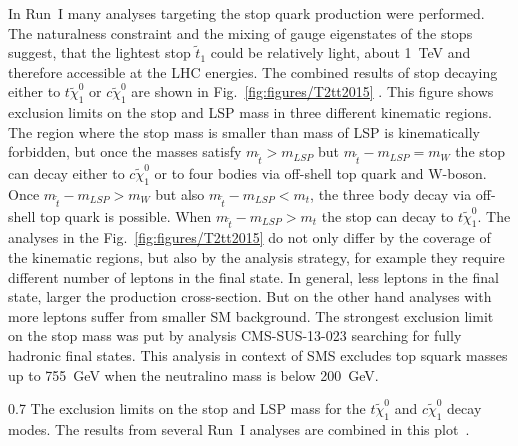 In Run~I many analyses targeting the stop quark production were performed. The naturalness constraint and the mixing of gauge eigenstates of the stops suggest, that the lightest stop $\tilde{t}_{1}$ could be relatively light, about 1~TeV and therefore accessible at the LHC energies. The combined results of stop decaying either to $t \tilde{\chi}_{1}^0$ or $c \tilde{\chi}_{1}^0$ are shown in Fig.~\ref{fig:figures/T2tt2015} . This figure shows exclusion limits on the stop and LSP mass in three different kinematic regions. The region where the stop mass is smaller than mass of LSP is kinematically forbidden, but once the masses satisfy $m_{\tilde{t}} > m_{LSP}$ but $m_{\tilde{t}} - m_{LSP} = m_{W}$ the stop can decay either to $c \tilde{\chi}_{1}^0$ or to four bodies via off-shell top quark and W-boson. Once  $m_{\tilde{t}} - m_{LSP} > m_{W}$ but also  $m_{\tilde{t}} - m_{LSP} < m_{t}$, the three body decay via off-shell top quark is possible. When  $m_{\tilde{t}} - m_{LSP} > m_{t}$  the stop can decay to $t \tilde{\chi}_{1}^0$. The analyses in the Fig.~\ref{fig:figures/T2tt2015} do not only differ by the coverage of the kinematic regions, but also by the analysis strategy, for example they require different number of leptons in the final state. In general, less leptons in the final state, larger the production cross-section. But on the other hand analyses with more leptons suffer from smaller SM background.  The strongest exclusion limit on the stop mass was put by analysis CMS-SUS-13-023 searching for fully hadronic final states. This analysis in context of SMS excludes top squark masses up to 755~GeV when the neutralino mass is below 200~GeV.


                 {0.7}       %
                { The exclusion limits on the stop and LSP mass for the $t \tilde{\chi}_{1}^0$ and $c \tilde{\chi}_{1}^0$ decay modes. The results from several Run~I analyses are combined in this plot~\cite{website:SUSYresRunI}.   } %

\newpage
